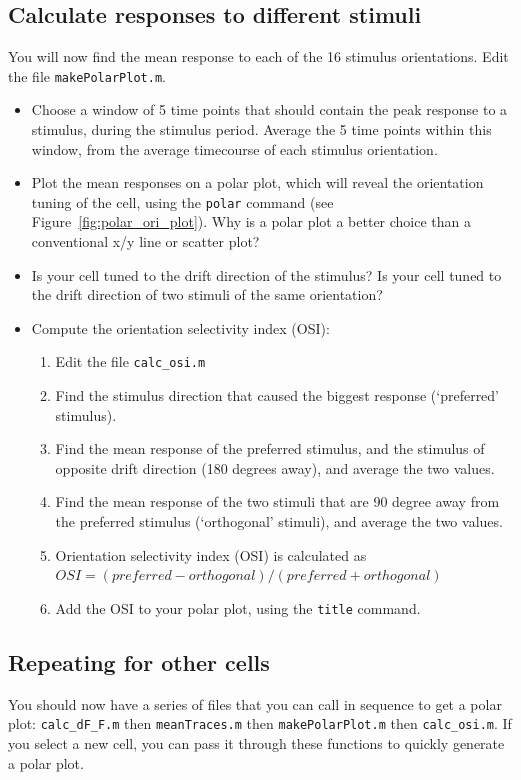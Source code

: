 \documentclass[paper=a4, fontsize=11pt]{scrartcl} %
\numberwithin{equation}{section} %
\numberwithin{figure}{section} %
\numberwithin{table}{section} %
\begin{document}
\subsection{Calculate responses to different stimuli}
You will now find the mean response to each of the 16 stimulus orientations. Edit the file \texttt{makePolarPlot.m}.
\begin{itemize}
\setlength{\parskip}{0.25em}
\item Choose a window of 5 time points that should contain the peak response to a stimulus, during the stimulus period. Average the 5 time points within this window, from the average timecourse of each stimulus orientation.
\item Plot the mean responses on a polar plot, which will reveal the orientation tuning of the cell, using the \texttt{polar} command (see Figure~\ref{fig:polar_ori_plot}). Why is a polar plot a better choice than a conventional x/y line or scatter plot?
\item Is your cell tuned to the drift direction of the stimulus? Is your cell tuned to the drift direction of two stimuli of the same orientation?
\item Compute the orientation selectivity index (OSI):
    \begin{enumerate}
    \item Edit the file \texttt{calc\_osi.m}
    \item Find the stimulus direction that caused the biggest response (`preferred' stimulus).
    \item Find the mean response of the preferred stimulus, and the stimulus of opposite drift direction (180 degrees away), and average the two values.
    \item Find the mean response of the two stimuli that are 90 degree away from the preferred stimulus (`orthogonal' stimuli), and average the two values.
    \item Orientation selectivity index (OSI) is calculated as \\ $OSI = {\left(preferred - orthogonal\right)} / {\left(preferred + orthogonal\right)}$
    \item Add the OSI to your polar plot, using the \texttt{title} command.
    \end{enumerate}
\end{itemize}

\subsection{Repeating for other cells}
You should now have a series of files that you can call in sequence to get a polar plot: \texttt{calc\_dF\_F.m} then \texttt{meanTraces.m} then \texttt{makePolarPlot.m} then \texttt{calc\_osi.m}. If you select a new cell, you can pass it through these functions to quickly generate a polar plot. 
\end{document}
